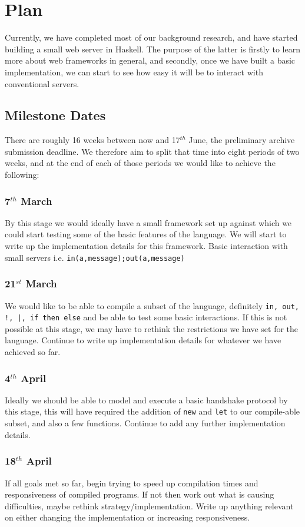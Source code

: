 \section{Plan}

Currently, we have completed most of our background research, and have started building a small web server in Haskell. The purpose of the latter is firstly to learn more about web frameworks in general, and secondly, once we have built a basic implementation, we can start to see how easy it will be to interact with conventional servers.

\subsection{Milestone Dates}

There are roughly 16 weeks between now and 17$^{th}$ June, the preliminary archive submission deadline. We therefore aim to split that time into eight periods of two weeks, and at the end of each of those periods we would like to achieve the following:
\subsubsection{7$^{th}$ March} 
By this stage we would ideally have a small framework set up against which we could start testing some of the basic features of the language. We will start to write up the implementation details for this framework.
Basic interaction with small servers i.e. \verb!in(a,message);out(a,message)!   
\subsubsection{21$^{st}$ March}
We would like to be able to compile a subset of the language, definitely \verb?in, out, !, |, if then else? and be able to test some basic interactions. If this is not possible at this stage, we may have to rethink the restrictions we have set for the language. Continue to write up implementation details for whatever we have achieved so far. 
\subsubsection{4$^{th}$ April}  
Ideally we should be able to model and execute a basic handshake protocol by this stage, this will have required the addition of \verb!new! and \verb!let! to our compile-able subset, and also a few functions. Continue to add any further implementation details.
\subsubsection{18$^{th}$ April}
If all goals met so far, begin trying to speed up compilation times and responsiveness of compiled programs. If not then work out what is causing difficulties, maybe rethink strategy/implementation. Write up anything relevant on either changing the implementation or increasing responsiveness.
